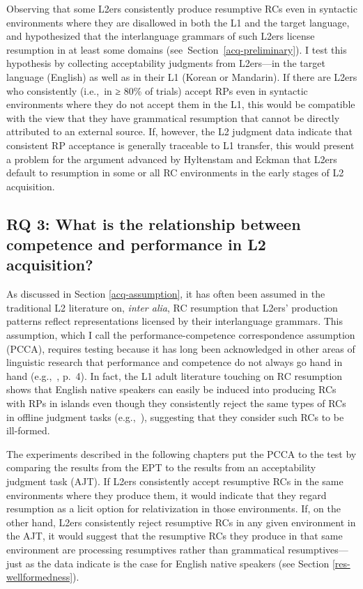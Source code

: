 Observing that some L2ers consistently produce resumptive RCs even in syntactic environments where they are disallowed in both the L1 and the target language, \textcite{hyltenstam1984,hyltenstam1990} and \textcite{eckman2004} hypothesized that the interlanguage grammars of such L2ers license resumption in at least some domains (see~Section~\ref{acq-preliminary}). I test this hypothesis by collecting acceptability judgments from L2ers---in the target language (English) as well as in their L1 (Korean or Mandarin). If there are L2ers who consistently (i.e.,~in ≥ 80\% of trials) accept RPs even in syntactic environments where they do not accept them in the L1, this would be compatible with the view that they have grammatical resumption that cannot be directly attributed to an external source. If, however, the L2 judgment data indicate that consistent RP acceptance is generally traceable to L1 transfer, this would present a problem for the argument advanced by Hyltenstam and Eckman that L2ers default to resumption in some or all RC environments in the early stages of L2 acquisition.

\subsection{RQ 3: What is the relationship between competence and performance in L2 acquisition?}

As discussed in Section \ref{acq-assumption}, it has often been assumed in the traditional L2 literature on, \textit{inter alia}, RC resumption that L2ers' production patterns reflect representations licensed by their interlanguage grammars. This assumption, which I call the performance-competence correspondence assumption (PCCA), requires testing because it has long been acknowledged in other areas of linguistic research that performance and competence do not always go hand in hand (e.g.,~\cite{chomsky1965}, p.~4). In fact, the L1 adult literature touching on RC resumption shows that English native speakers can easily be induced into producing RCs with RPs in islands even though they consistently reject the same types of RCs in offline judgment tasks (e.g.,~\cite{ferreira.swets2005}), suggesting that they consider such RCs to be ill-formed. 

The experiments described in the following chapters put the PCCA to the test by comparing the results from the EPT to the results from an acceptability judgment task (AJT). If L2ers consistently accept resumptive RCs in the same environments where they produce them, it would indicate that they regard resumption as a licit option for relativization in those environments. If, on the other hand, L2ers consistently reject resumptive RCs in any given environment in the AJT, it would suggest that the resumptive RCs they produce in that same environment are processing resumptives rather than grammatical resumptives---just as the data indicate is the case for English native speakers (see Section \ref{res-wellformedness}).

